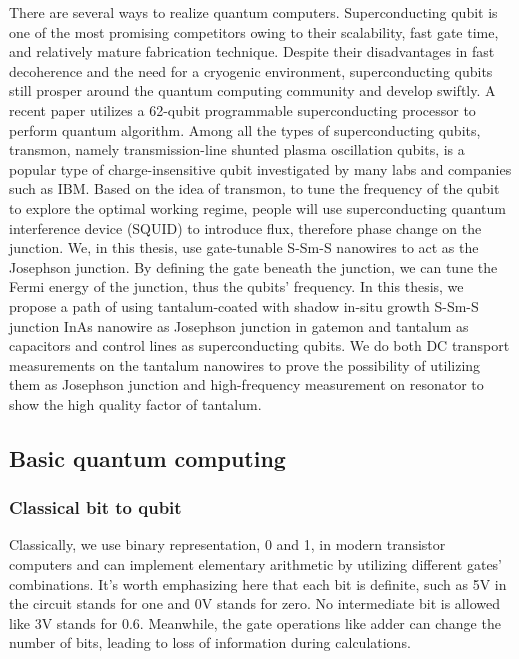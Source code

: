 There are several ways to realize quantum computers. Superconducting qubit is one of the most promising competitors owing to their scalability, fast gate time, and relatively mature fabrication technique. Despite their disadvantages in fast decoherence and the need for a cryogenic environment, superconducting qubits still prosper around the quantum computing community and develop swiftly. A recent paper utilizes a 62-qubit programmable superconducting processor to perform quantum algorithm\cite{RN43}. Among all the types of superconducting qubits, transmon, namely transmission-line shunted plasma oscillation qubits, is a popular type of charge-insensitive qubit investigated by many labs and companies such as IBM. Based on the idea of transmon, to tune the frequency of the qubit to explore the optimal working regime, people will use superconducting quantum interference device (SQUID) to introduce flux, therefore phase change on the junction. We, in this thesis, use gate-tunable S-Sm-S nanowires to act as the Josephson junction. By defining the gate beneath the junction, we can tune the Fermi energy of the junction, thus the qubits' frequency. In this thesis, we propose a path of using tantalum-coated with shadow in-situ growth S-Sm-S junction InAs nanowire as Josephson junction in gatemon and tantalum as capacitors and control lines as superconducting qubits. We do both DC transport measurements on the tantalum nanowires to prove the possibility of utilizing them as Josephson junction and high-frequency measurement on resonator to show the high quality factor of tantalum.  

\subsection{Basic quantum computing}
\subsubsection{Classical bit to qubit}
Classically, we use binary representation, 0 and 1, in modern transistor computers and can implement elementary arithmetic by utilizing different gates' combinations. It's worth emphasizing here that each bit is definite, such as 5V in the circuit stands for one and 0V stands for zero. No intermediate bit is allowed like 3V stands for 0.6. Meanwhile, the gate operations like adder can change the number of bits, leading to loss of information during calculations.

